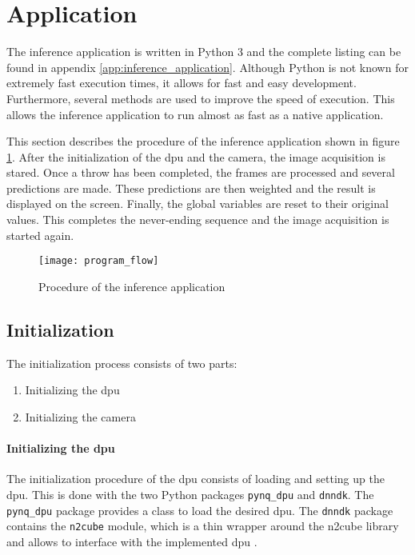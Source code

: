 \section{Application}
\label{sec:inference:app}

The inference application is written in Python 3 and the complete listing can be found in appendix \ref{app:inference_application}.
Although Python is not known for extremely fast execution times, it allows for fast and easy development.
Furthermore, several methods are used to improve the speed of execution.
This allows the inference application to run almost as fast as a native application.

This section describes the procedure of the inference application shown in figure \ref{fig:procedure_inference_app}.
After the initialization of the \acrshort{dpu} and the camera, the image acquisition is stared.
Once a throw has been completed, the frames are processed and several predictions are made.
These predictions are then weighted and the result is displayed on the screen.
Finally, the global variables are reset to their original values.
This completes the never-ending sequence and the image acquisition is started again.

\begin{figure}
  \centering
  \texttt{[image: program\_flow]}
  \caption{Procedure of the inference application}
  \label{fig:procedure_inference_app}
\end{figure}

\subsection{Initialization}
\label{subsec:inference:app:initialization}

The initialization process consists of two parts:
\begin{enumerate}
  \item Initializing the \acrshort{dpu}
  \item Initializing the camera
\end{enumerate}

\paragraph{Initializing the \acrshort{dpu}}
The initialization procedure of the \acrshort{dpu} consists of loading and setting up the \acrshort{dpu}.
This is done with the two Python packages \texttt{pynq\_dpu} and \texttt{dnndk}.
The \texttt{pynq\_dpu} package provides a class to load the desired \acrshort{dpu}.
The \texttt{dnndk} package contains the \texttt{n2cube} module, which is a thin wrapper around the \acrshort{n2cube} library and allows to interface with the implemented \acrshort{dpu} \cite{inf_github_dpu_pynq}.

